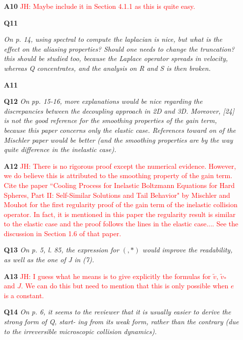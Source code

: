 \documentclass[11pt]{article}
\newcommand{\jh}[1]{\textcolor{red}{JH: #1}}
\begin{document}
\begin{itemize}
\item[{\bf A10}] \jh{Maybe include it in Section 4.1.1 as this is quite easy.}


\item[{\bf Q11}] {\it On p. 14, using spectral to compute the laplacian is nice, but what is the effect on the aliasing properties? Should one needs to change the truncation? this should be studied too, because the Laplace operator spreads in velocity, whereas Q concentrates, and the analysis on R and S is then broken.

}

\item[{\bf A11}] 


\item[{\bf Q12}] {\it On pp. 15-16, more explanations would be nice regarding the discrepancies between the decoupling approach in 2D and 3D. Moreover, [24] is not the good reference for the smoothing properties of the gain term, because this paper concerns only the elastic case. References toward on of the Mischler paper would be better (and the smoothing properties are by the way quite difference in the inelastic case).
}

\item[{\bf A12}] \jh{There is no rigorous proof except the numerical evidence. However, we do believe this is attributed to the smoothing property of the gain term. Cite the paper ``Cooling Process for Inelastic Boltzmann Equations for Hard Spheres, Part II: Self-Similar Solutions and Tail Behavior" by Mischler and Mouhot for the first regularity proof of the gain term of the inelastic collision operator. In fact, it is mentioned in this paper the regularity result is similar to the elastic case and the proof follows the lines in the elastic case.... See the discussion in Section 1.6 of that paper.}


\item[{\bf Q13}] {\it On p. 5, l. 85, the expression for $(,*)$ would improve the readability, as well as the one of J in (7).}

\item[{\bf A13}] \jh{I guess what he means is to give explicitly the formulas for $\tilde{v}$, $\tilde{v}_*$ and $J$. We can do this but need to mention that this is only possible when $e$ is a constant.}


\item[{\bf Q14}] {\it On p. 6, it seems to the reviewer that it is usually easier to derive the strong form of Q, start- ing from its weak form, rather than the contrary (due to the irreversible microscopic collision dynamics).}


\end{itemize}
\end{document}
